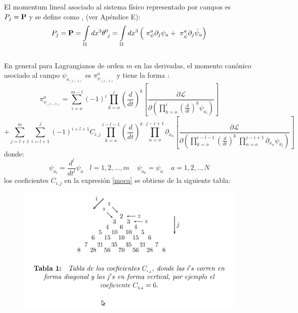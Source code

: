 \documentclass[a4paper,12pt]{article}
\begin{document}
El momentum lineal asociado al sistema físico representado por campos es $P_{j}={\bf P}$ y se define como \cite{ noether, greiner,podolsky}, (ver Apéndice E):
\begin{equation}
P_{j}=\mathbf{P}=\int\limits_{\Omega}dx^{3}\theta^{0}_{\ j}=\int\limits_{\Omega}dx^{3}\left( \ \pi^{a}_{\psi}\partial_j\psi_a +\ \pi^{a}_{\dot\psi}\partial_j\dot\psi_a\ \\ \right) 
\end{equation}
\\

En general para Lagrangianos de orden $m$ en las derivadas, el momento canónico asociado al campo $\psi_{a_{(l-1)}}$ es $\pi^{a}_{\psi_{(l-1)}}$ y tiene la forma \cite{general}:  
\begin{equation}
\pi^{a}_{\psi_{(l-1)}}=\sum\limits_{i=o}^{m-l}(-1)^i\prod\limits_{k=o}^{i}\left(\frac{d}{dt}\right)^k\left[\frac{\partial\mathscr{L}}{\partial\left(\prod\limits_{k=o}^{i}\left(\frac{d}{dt}\right)^k\psi_{a_l}\right)}\right]
\label{moca}
\end{equation}
$$+\sum\limits_{j=l+1}^{m}\sum\limits_{i=l+1}^{j}(-1)^{i+l+1}C_{i,j}\prod\limits_{k=o}^{i-l-1}\left(\frac{d}{dt}\right)^k\  \prod\limits_{n=o}^{j-i+1}\partial_{x_n}\left[\frac{\partial\mathscr{L}}{\partial\left(\prod\limits_{k=o}^{i-l-1}\left(\frac{d}{dt}\right)^k\ \prod\limits_{n=o}^{j-i+1}\partial_{x_n}{\psi}_{a_l}\right)}\right]$$
donde: 
\begin{equation}
\psi_{a_l}=\frac{d^l}{dt^l}\psi_a \ \ \ \ l=1,2,...,m \ \ \ \ \ \psi_{a_0}=\psi_a \ \ \ \ \ a=1,2,..,N 
\label{cavar}
\end{equation}
los coeficientes $C_{i,j}$ en la expresión \eqref{moca} se obtiene de la siguiente tabla:
\begin{figure}[H]
\centering
\includegraphics[width=1 \textwidth]{tabla.png}
\end{figure}
\end{document}
